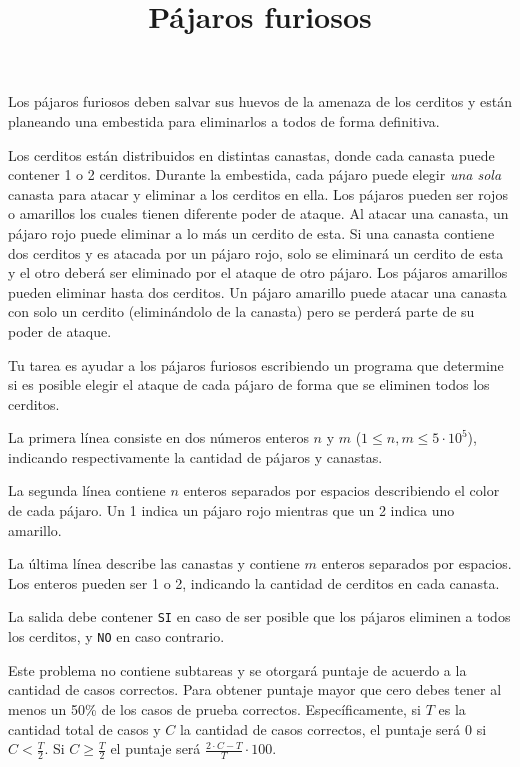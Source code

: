\documentclass{oci}
\title{Pájaros furiosos}
\begin{document}
\begin{problemDescription}
Los pájaros furiosos deben salvar sus huevos de la amenaza de los
cerditos y están planeando una embestida
para eliminarlos a todos de forma definitiva.

Los cerditos están distribuidos en distintas canastas, donde cada
canasta puede contener 1 o 2 cerditos.
Durante la embestida, cada pájaro puede elegir \emph{una sola} canasta para
atacar y eliminar a los cerditos en ella.
Los pájaros pueden ser rojos o amarillos los cuales tienen
diferente poder de ataque.
Al atacar una canasta, un pájaro rojo puede eliminar a lo más un
cerdito de esta.
Si una canasta contiene dos cerditos y es atacada por un pájaro rojo,
solo se eliminará un cerdito de esta y el otro deberá ser eliminado por
el ataque de otro pájaro.
Los pájaros amarillos pueden eliminar hasta dos cerditos.
Un pájaro amarillo puede atacar una canasta con solo un cerdito
(eliminándolo de la canasta) pero se perderá parte de su poder
de ataque.

Tu tarea es ayudar a los pájaros furiosos escribiendo un programa
que determine si es posible elegir el ataque de cada pájaro de forma
que se eliminen todos los cerditos.
\end{problemDescription}

\begin{inputDescription}
	La primera línea consiste en dos números enteros $n$ y $m$ ($1 \leq n, m \leq 5 \cdot 10^5$),
	indicando respectivamente la cantidad de pájaros y canastas.

	La segunda línea contiene $n$ enteros separados por espacios describiendo
	el color de cada pájaro.
	Un 1 indica un pájaro rojo mientras que un 2 indica uno amarillo.

	La última línea describe las canastas y contiene $m$ enteros separados por espacios.
	Los enteros pueden ser 1 o 2, indicando la cantidad de cerditos en cada canasta.
\end{inputDescription}

\begin{outputDescription}
	La salida debe contener \texttt{SI} en caso de ser posible que los pájaros
	eliminen a todos los cerditos, y \texttt{NO} en caso contrario.
\end{outputDescription}

\begin{scoreDescription}
Este problema no contiene subtareas y se otorgará puntaje de acuerdo a la cantidad de
casos correctos.
Para obtener puntaje mayor que cero debes tener al menos un 50\% de los casos de
prueba correctos.
Específicamente, si $T$ es la cantidad total de casos y $C$ la cantidad de casos correctos,
el puntaje será 0 si $C < \frac{T}{2}$.
Si $C \geq \frac{T}{2}$ el puntaje será $\frac{2\cdot C - T}{T}\cdot 100$.
\end{scoreDescription}

\begin{sampleDescription}
\end{sampleDescription}
\end{document}
